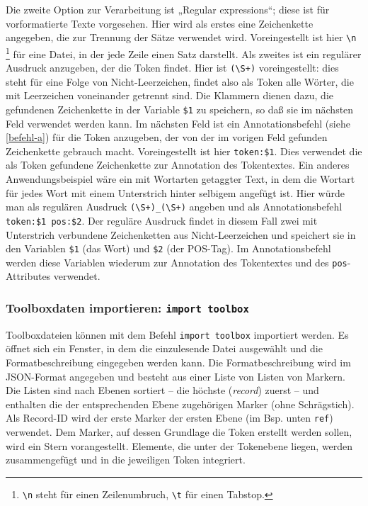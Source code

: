\documentclass[12pt]{scrartcl}
\begin{document}
Die zweite Option zur Verarbeitung ist „Regular expressions“; diese ist für vorformatierte Texte vorgesehen. Hier wird als erstes eine Zeichenkette angegeben, die zur Trennung der Sätze verwendet wird. Voreingestellt ist hier \texttt{{\textbackslash}n} \footnote{\texttt{{\textbackslash}n} steht für einen Zeilenumbruch, \texttt{{\textbackslash}t} für einen Tabstop.} für eine Datei, in der jede Zeile einen Satz darstellt. Als zweites ist ein regulärer Ausdruck anzugeben, der die Token findet. Hier ist \texttt{({\textbackslash}S+)} voreingestellt: dies steht für eine Folge von Nicht-Leerzeichen, findet also als Token alle Wörter, die mit Leerzeichen voneinander getrennt sind. Die Klammern dienen dazu, die gefundenen Zeichenkette in der Variable \texttt{\$1} zu speichern, so daß sie im nächsten Feld verwendet werden kann. Im nächsten Feld ist ein Annotationsbefehl (siehe \ref{befehl-a}) für die Token anzugeben, der von der im vorigen Feld gefunden Zeichenkette gebrauch macht. Voreingestellt ist hier \texttt{token:\$1}. Dies verwendet die als Token gefundene Zeichenkette zur Annotation des Tokentextes. Ein anderes Anwendungsbeispiel wäre ein mit Wortarten getaggter Text, in dem die Wortart für jedes Wort mit einem Unterstrich hinter selbigem angefügt ist. Hier würde man als regulären Ausdruck \texttt{({\textbackslash}S+)\_({\textbackslash}S+)} angeben und als Annotationsbefehl \texttt{token:\$1 pos:\$2}. Der reguläre Ausdruck findet in diesem Fall zwei mit Unterstrich verbundene Zeichenketten aus Nicht-Leerzeichen und speichert sie in den Variablen \texttt{\$1} (das Wort) und \texttt{\$2} (der POS-Tag). Im Annotationsbefehl werden diese Variablen wiederum zur Annotation des Tokentextes und des \texttt{pos}-Attributes verwendet.


\subsubsection{Toolboxdaten importieren: \texttt{import toolbox}}

Toolboxdateien können mit dem Befehl \texttt{import toolbox} importiert werden. Es öffnet sich ein Fenster, in dem die einzulesende Datei ausgewählt und die Formatbeschreibung eingegeben werden kann. Die Formatbeschreibung wird im JSON-Format angegeben und besteht aus einer Liste von Listen von Markern. Die Listen sind nach Ebenen sortiert – die höchste (\textit{record}) zuerst – und enthalten die der entsprechenden Ebene zugehörigen Marker (ohne Schrägstich). Als Record-ID wird der erste Marker der ersten Ebene (im Bsp. unten \texttt{ref}) verwendet. Dem Marker, auf dessen Grundlage die Token erstellt werden sollen, wird ein Stern vorangestellt. Elemente, die unter der Tokenebene liegen, werden zusammengefügt und in die jeweiligen Token integriert.
\end{document}
